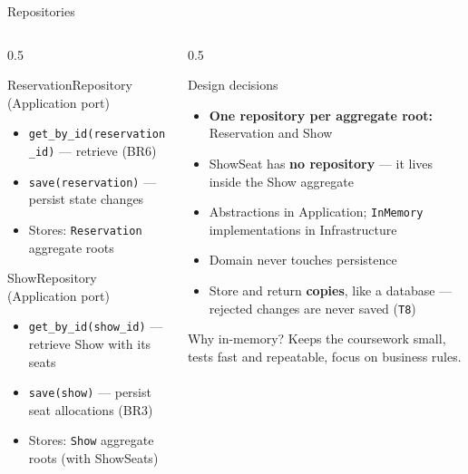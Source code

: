 \documentclass[aspectratio=169,11pt]{beamer}
\newcommand{\code}[1]{\texttt{#1}}
\begin{document}
\begin{frame}{Repositories}
  \begin{columns}[t]
    \begin{column}{0.5\textwidth}
      \begin{block}{ReservationRepository (Application port)}
        \scriptsize
        \begin{itemize}
          \item \code{get\_by\_id(reservation\_id)} --- retrieve (BR6)
          \item \code{save(reservation)} --- persist state changes
          \item Stores: \code{Reservation} aggregate roots
        \end{itemize}
      \end{block}
      \begin{block}{ShowRepository (Application port)}
        \scriptsize
        \begin{itemize}
          \item \code{get\_by\_id(show\_id)} --- retrieve Show with its seats
          \item \code{save(show)} --- persist seat allocations (BR3)
          \item Stores: \code{Show} aggregate roots (with ShowSeats)
        \end{itemize}
      \end{block}
    \end{column}
    \begin{column}{0.5\textwidth}
      \begin{block}{Design decisions}
        \scriptsize
        \begin{itemize}
          \item \textbf{One repository per aggregate root:} Reservation and
                Show
          \item ShowSeat has \textbf{no repository} --- it lives inside the
                Show aggregate
          \item Abstractions in Application; \code{InMemory}
                implementations in Infrastructure
          \item Domain never touches persistence
          \item Store and return \textbf{copies}, like a database --- rejected
                changes are never saved (\code{T8})
        \end{itemize}
      \end{block}
      \begin{block}{Why in-memory?}
        \scriptsize Keeps the coursework small, tests fast and repeatable,
        focus on business rules.
      \end{block}
    \end{column}
  \end{columns}
\end{frame}
\end{document}
